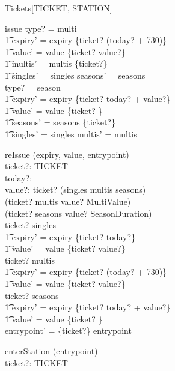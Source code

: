 \documentclass[11pt]{article}
\begin{document}
\begin{class}{Tickets[TICKET, STATION]}
\begin{op}{issue}
type? = multi \implies\\
\t1 expiry' = expiry \cup \{ticket? \mapsto (today? + 730)\} \land \\ 
\t1 value' = value \cup \{ticket? \mapsto value?\} \land \\ 
\t1 multis' = multis \cup \{ticket?\} \land \\ 
\t1 singles' = singles \land seasons' = seasons\\
type? = season \implies\\
\t1 expiry' = expiry \cup \{ticket? \mapsto today? + value?\} \land \\ 
\t1 value' = value \cup \{ticket? \} \land \\ 
\t1 seasons' = seasons \cup \{ticket?\} \land \\ 
\t1 singles' = singles \land  multis' = multis
\end{op}
\classbreak 
\begin{op}{reIssue}
\Delta (expiry, value, entrypoint)\\
ticket?: TICKET \\ 
today?:  \nat  \\ 
value?:  \nat  
\where
 ticket? \in (singles \cup multis \cup seasons) \land\\
     (ticket? \in multis \implies value? \in MultiValue) \land\\
     (ticket? \in seasons \implies value? \in SeasonDuration)\\
ticket? \in singles \implies\\
\t1 expiry' = expiry \oplus \{ticket? \mapsto today?\} \land \\ 
\t1 value' = value \oplus \{ticket? \mapsto value?\}\\ 
ticket? \in multis \implies\\
\t1 expiry' = expiry \oplus  \{ticket? \mapsto (today? + 730)\} \land \\ 
\t1 value' = value \oplus \{ticket? \mapsto value?\} \\ 
ticket? \in seasons \implies\\
\t1 expiry' = expiry \oplus \{ticket? \mapsto today? + value?\} \land \\ 
\t1 value' = value \oplus \{ticket? \}\\
entrypoint' = \{ticket?\} \ndres entrypoint
\end{op} \classbreak 
\begin{op}{enterStation}
\Delta (entrypoint)\\
ticket?: TICKET \\ 

\end{op}
\end{class}
\end{document}
